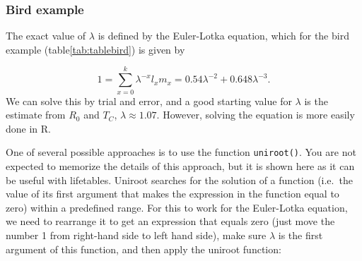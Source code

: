 \documentclass[
]{book}
\newenvironment{Shaded}{\begin{snugshade}}{\end{snugshade}}
\newcommand{\AttributeTok}[1]{\textcolor[rgb]{0.77,0.63,0.00}{#1}}
\newcommand{\CommentTok}[1]{\textcolor[rgb]{0.56,0.35,0.01}{\textit{#1}}}
\newcommand{\ControlFlowTok}[1]{\textcolor[rgb]{0.13,0.29,0.53}{\textbf{#1}}}
\newcommand{\DecValTok}[1]{\textcolor[rgb]{0.00,0.00,0.81}{#1}}
\newcommand{\FunctionTok}[1]{\textcolor[rgb]{0.00,0.00,0.00}{#1}}
\newcommand{\NormalTok}[1]{#1}
\newcommand{\OtherTok}[1]{\textcolor[rgb]{0.56,0.35,0.01}{#1}}
\newcommand{\SpecialCharTok}[1]{\textcolor[rgb]{0.00,0.00,0.00}{#1}}
\begin{document}
\hypertarget{bird-example-3}{%
\subsubsection*{Bird example}\label{bird-example-3}}

The exact value of \(\lambda\) is defined by the Euler-Lotka equation, which for the bird example (table\ref{tab:tablebird}) is given by

\[
1=\sum_{x=0}^{k}\lambda^{-x}l_xm_x=0.54\lambda^{-2}+0.648\lambda^{-3}.
\]
We can solve this by trial and error, and a good starting value for \(\lambda\) is the estimate from \(R_0\) and \(T_C\), \(\lambda \approx1.07\). However, solving the equation is more easily done in R.

One of several possible approaches is to use the function \texttt{uniroot()}. You are not expected to memorize the details of this approach, but it is shown here as it can be useful with lifetables. Uniroot searches for the solution of a function (i.e.~the value of its first argument that makes the expression in the function equal to zero) within a predefined range. For this to work for the Euler-Lotka equation, we need to rearrange it to get an expression that equals zero (just move the number 1 from right-hand side to left hand side), make sure \(\lambda\) is the first argument of this function, and then apply the uniroot function:

\begin{Shaded}
\end{Shaded}
\end{document}
